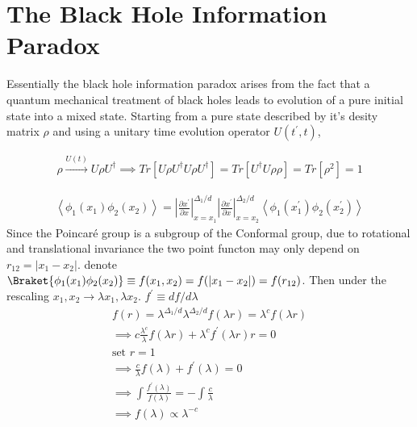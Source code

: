 \chapter{The Black Hole Information Paradox}
Essentially the black hole information paradox arises from the fact that a quantum mechanical treatment of black holes leads to evolution of a pure initial state into a mixed state. Starting from a pure state described by it's desity matrix $\rho$ and using a unitary time evolution operator $U(t^\prime, t)$, 

 \begin{align*}
  \rho \xrightarrow{U(t)} U \rho U^\dag
  \implies Tr[U \rho U^\dag U \rho U^\dag] = Tr[ U^\dag U \rho \rho] =  Tr[\rho^2] =1
 \end{align*}
 
\begin{align*}
 \left\langle \phi_1(x_1) \phi_2(x_2)\right\rangle = \left| \frac{\partial x^\prime}{\partial x}\right|_{x=x_1}^{\Delta_1/d} \left| \frac{\partial x^\prime}{\partial x}\right|_{x=x_2}^{\Delta_2/d} \left\langle \phi_1(x_1^\prime) \phi_2(x_2^\prime) \right\rangle
\end{align*}
Since the Poincar\'{e} group is a subgroup of the Conformal group, due to rotational and translational invariance the two point functon may only depend on $r_{12}=|x_1-x_2|$. denote $\Braket{\phi_1(x_1)\phi_2(x_2)} \equiv f(x_1,x_2) = f(|x_1-x_2|)=f(r_{12})$. 
Then under the rescaling $x_1, x_2 \to \lambda x_1, \lambda x_2$. $f^\prime \equiv {df}/{d\lambda}$
\begin{align*}
 f(r)=\lambda^{\Delta_1/d} \lambda^{\Delta_2/d} f(\lambda r) = \lambda^c  f(\lambda r) \\
 \implies c\frac{\lambda^c}{\lambda} f(\lambda r) + \lambda^c f^\prime(\lambda r) r =0 \\
 \text{set } r = 1 \\
 \implies \frac{c}{\lambda} f(\lambda) + f^\prime(\lambda ) = 0 \\
 \implies \int \frac{f^\prime(\lambda )}{f(\lambda)} = - \int \frac{c}{\lambda} \\
 \implies f(\lambda) \propto \lambda^{-c}
\end{align*}

